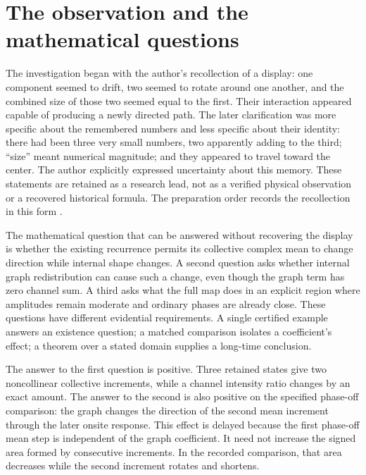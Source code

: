 \documentclass[11pt,a4paper]{article}
\numberwithin{equation}{section}
\theoremstyle{remark}\newtheorem{remark}[theorem]{Remark}
\begin{document}
\hypersetup{pageanchor=true}
\setcounter{tocdepth}{1}
\begingroup\small\setlength{\parskip}{0pt}\tableofcontents\endgroup
\clearpage{}

\section{The observation and the mathematical questions}\label{sec:overview}

The investigation began with the author's recollection of a display: one component seemed to drift, two seemed to rotate around one another, and the combined size of those two seemed equal to the first. Their interaction appeared capable of producing a newly directed path. The later clarification was more specific about the remembered numbers and less specific about their identity: there had been three very small numbers, two apparently adding to the third; ``size'' meant numerical magnitude; and they appeared to travel toward the center. The author explicitly expressed uncertainty about this memory. These statements are retained as a research lead, not as a verified physical observation or a recovered historical formula. The preparation order records the recollection in this form \cite{order}.

The mathematical question that can be answered without recovering the display is whether the existing recurrence permits its collective complex mean to change direction while internal shape changes. A second question asks whether internal graph redistribution can cause such a change, even though the graph term has zero channel sum. A third asks what the full map does in an explicit region where amplitudes remain moderate and ordinary phases are already close. These questions have different evidential requirements. A single certified example answers an existence question; a matched comparison isolates a coefficient's effect; a theorem over a stated domain supplies a long-time conclusion.

The answer to the first question is positive. Three retained states give two noncollinear collective increments, while a channel intensity ratio changes by an exact amount. The answer to the second is also positive on the specified phase-off comparison: the graph changes the direction of the second mean increment through the later onsite response. This effect is delayed because the first phase-off mean step is independent of the graph coefficient. It need not increase the signed area formed by consecutive increments. In the recorded comparison, that area decreases while the second increment rotates and shortens.
\end{document}
